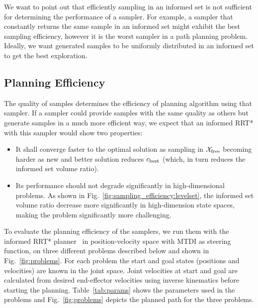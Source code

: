 \documentclass[letterpaper, 10 pt, conference]{ieeeconf}  %
\begin{document}
We want to point out that efficiently sampling in an informed set is not sufficient for determining the performance of a sampler.
For example, a sampler that constantly returns the same sample in an informed set might exhibit the best sampling efficiency, however it is the worst sampler in a path planning problem.
Ideally, we want generated samples to be uniformly distributed in an informed set to get the best exploration.

\subsection{Planning Efficiency}

The quality of samples determines the efficiency of planning algorithm using that sampler.
If a sampler could provide samples with the same quality as others but generate samples in a much more efficient way, we expect that an informed RRT* with this sampler would show two properties:
\begin{itemize}
	\item It shall converge faster to the optimal solution as sampling in $\mathcal{X}_{\rm free}$ becoming harder as new and better solution reduces $ c_{\rm best} $ (which,  in turn reduces the informed set volume ratio).
	\item Its performance should not degrade significantly in high-dimensional problems.
	As shown in Fig.~\ref{fig:sampling_efficiency:levelset}, the informed set volume ratio decrease more significantly in high-dimension state spaces, making the problem significantly more challenging.
\end{itemize}

To evaluate the planning efficiency of the samplers, we run them with the informed RRT* planner~\cite{GSB14} in position-velocity space with MTDI as steering function, on three different problems described below and shown in Fig.~\ref{fig:problems}. 
For each problem the start and goal states (positions and velocities) are known in the joint space. 
Joint velocities at start and goal are calculated from desired end-effector velocities using inverse kinematics before starting the planning. Table~\ref{tab:params} shows the parameters used in the problems and Fig.~\ref{fig:problems} depicts the planned path for the three problems.
\end{document}

